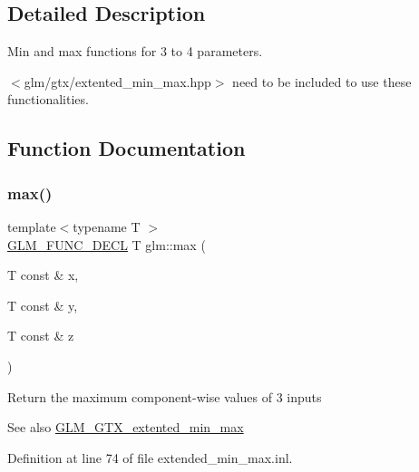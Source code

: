 \subsection{Detailed Description}
Min and max functions for 3 to 4 parameters.

$<$glm/gtx/extented\+\_\+min\+\_\+max.\+hpp$>$ need to be included to use these functionalities. 

\subsection{Function Documentation}
\mbox{\label{group__gtx__extented__min__max_ga04991ccb9865c4c4e58488cfb209ce69}} 
\subsubsection{\texorpdfstring{max()}{max()}\hspace{0.1cm}{\footnotesize\ttfamily [1/6]}}
{\footnotesize\ttfamily template$<$typename T $>$ \\
\mbox{\hyperlink{setup_8hpp_ab2d052de21a70539923e9bcbf6e83a51}{G\+L\+M\+\_\+\+F\+U\+N\+C\+\_\+\+D\+E\+CL}} T glm\+::max (\begin{DoxyParamCaption}\item[{T const \&}]{x,  }\item[{T const \&}]{y,  }\item[{T const \&}]{z }\end{DoxyParamCaption})}

Return the maximum component-\/wise values of 3 inputs \begin{DoxySeeAlso}{See also}
\mbox{\hyperlink{group__gtx__extented__min__max}{G\+L\+M\+\_\+\+G\+T\+X\+\_\+extented\+\_\+min\+\_\+max}} 
\end{DoxySeeAlso}


Definition at line 74 of file extended\+\_\+min\+\_\+max.\+inl.

\mbox{\label{group__gtx__extented__min__max_gae1b7bbe5c91de4924835ea3e14530744}} 
